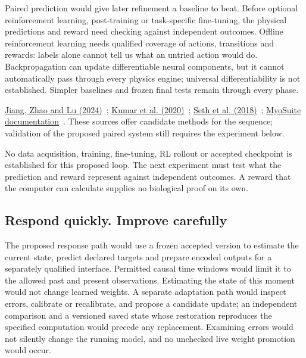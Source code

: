 Paired prediction would give later refinement a baseline to beat. Before
optional reinforcement learning, post-training or task-specific fine-tuning,
the physical predictions and reward need checking against independent
outcomes. Offline reinforcement learning needs qualified coverage of actions,
transitions and rewards: labels alone cannot tell us what an untried action
would do. Backpropagation can update differentiable neural components, but
it cannot automatically pass through every physics engine; universal
differentiability is not established. Simpler baselines and frozen final
tests remain through every phase.
\par\noindent \href{https://arxiv.org/html/2405.18765v1}{Jiang, Zhao and Lu (2024)}~\cite{labram2024}; \href{https://arxiv.org/abs/2006.04779v3}{Kumar et al. (2020)}~\cite{cql2020}; \href{https://journals.plos.org/ploscompbiol/article?id=10.1371/journal.pcbi.1006223}{Seth et al. (2018)}~\cite{opensim2018}; \href{https://myosuite.readthedocs.io/en/latest/}{MyoSuite documentation}~\cite{myosuiteDocsUndated}. These sources offer candidate methods for the sequence; validation of the proposed paired system still requires the experiment below.

No data acquisition, training, fine-tuning, RL rollout or accepted checkpoint
is established for this proposed loop. The next experiment must test what
the prediction and reward represent against independent outcomes. A reward
that the computer can calculate supplies no biological proof on its own.

\subsection{Respond quickly. Improve carefully}
\label{b2-frozen-response}
The proposed response path would use a frozen accepted version to estimate
the current state, predict declared targets and prepare encoded outputs for
a separately qualified interface. Permitted causal time windows would limit
it to the allowed past and present observations. Estimating the state of this
moment would not change learned weights. A separate adaptation path would
inspect errors, calibrate or recalibrate, and propose a candidate update;
an independent comparison and a versioned saved state whose restoration reproduces the specified computation would precede any replacement. Examining errors would not
silently change the running model, and no unchecked live weight promotion
would occur.

